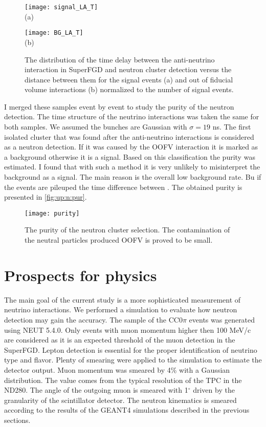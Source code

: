 \documentclass[main.tex]{subfiles}
\begin{document}
\begin{figure}[!ht]
  \centering
  \begin{minipage}{0.4\linewidth}
    \centering
    \texttt{[image: signal\_LA\_T]} \\ (a)
  \end{minipage}
  \begin{minipage}{0.4\linewidth}
    \centering
    \texttt{[image: BG\_LA\_T]} \\ (b)
  \end{minipage}
  \caption{The distribution of the time delay between the anti-neutrino interaction in SuperFGD and neutron cluster detection versus the distance between them for the signal events (a) and out of fiducial volume interactions (b) normalized to the number of signal events.}
  \label{sec:up:sfgd:pu}
\end{figure}

I merged these samples event by event to study the purity of the neutron detection. The time structure of the neutrino interactions was taken the same for both samples. We assumed the bunches are Gaussian with $\sigma=19$ ns.  The first isolated cluster that was found after the anti-neutrino interactions is considered as a neutron detection. If it was caused by the OOFV interaction it is marked as a background otherwise it is a signal. Based on this classification the purity was estimated. I found that with such a method it is very unlikely to misinterpret the background as a signal. The main reason is the overall low background rate. Bu if the events are pileuped the time difference between . The obtained purity is presented in \autoref{fig:up:n:pur}.

\begin{figure}[!ht]
  \centering
  \texttt{[image: purity]}
  \caption{The purity of the neutron cluster selection. The contamination of the neutral particles produced OOFV is proved to be small.}
  \label{fig:up:n:pur}
\end{figure}


\section{Prospects for physics}
The main goal of the current study is a more sophisticated measurement of neutrino interactions. We performed a simulation to evaluate how neutron detection may gain the accuracy. The sample of the CC0$\pi$ events was generated using NEUT 5.4.0. Only events with muon momentum higher then 100 MeV/c are considered as it is an expected threshold of the muon detection in the SuperFGD. Lepton detection is essential for the proper identification of neutrino type and flavor. Plenty of smearing were applied to the simulation to estimate the detector output. Muon momentum was smeared by 4\% with a Gaussian distribution. The value comes from the typical resolution of the TPC in the ND280. The angle of the outgoing muon is smeared with 1${}^\circ$ driven by the granularity of the scintillator detector. The neutron kinematics is smeared according to the results of the GEANT4 simulations described in the previous sections.
\end{document}

